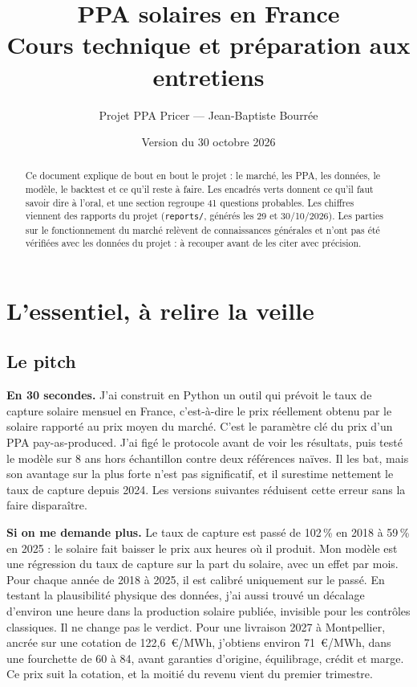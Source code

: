 \documentclass[11pt,a4paper]{article}
\title{\textbf{PPA solaires en France}\\[4pt]\large Cours technique et préparation aux entretiens}
\author{Projet PPA Pricer --- Jean-Baptiste Bourrée}
\date{Version du 30 octobre 2026}
\newcommand{\code}[1]{\texttt{\small #1}}
\begin{document}
\maketitle

\begin{abstract}
\noindent Ce document explique de bout en bout le projet : le marché, les PPA, les données, le modèle, le
backtest et ce qu'il reste à faire. Les encadrés verts donnent ce qu'il faut savoir dire à l'oral, et une section regroupe 41 questions probables.
Les chiffres viennent des rapports du projet (\code{reports/}, générés les 29 et 30/10/2026). Les
parties sur le fonctionnement du marché relèvent de connaissances générales et n'ont pas été
vérifiées avec les données du projet : à recouper avant de les citer avec précision.
\end{abstract}

\setcounter{tocdepth}{1}
\tableofcontents
\newpage

\section{L'essentiel, à relire la veille}

\subsection{Le pitch}

\begin{entretien}
\textbf{En 30 secondes.} J'ai construit en Python un outil qui prévoit le taux de capture solaire
mensuel en France, c'est-à-dire le prix réellement obtenu par le solaire rapporté au prix moyen du
marché. C'est le paramètre clé du prix d'un PPA pay-as-produced. J'ai figé le protocole avant de voir
les résultats, puis testé le modèle sur 8 ans hors échantillon contre deux références naïves. Il les
bat, mais son avantage sur la plus forte n'est pas significatif, et il surestime nettement le taux de
capture depuis 2024. Les versions suivantes réduisent cette erreur sans la faire disparaître.

\medskip
\textbf{Si on me demande plus.} Le taux de capture est passé de 102\,\% en 2018 à 59\,\% en 2025 : le
solaire fait baisser le prix aux heures où il produit. Mon modèle est une régression du taux de
capture sur la part du solaire, avec un effet par mois. Pour chaque année de 2018 à 2025, il est
calibré uniquement sur le passé. En testant la plausibilité physique des données, j'ai aussi trouvé
un décalage d'environ une heure dans la production solaire publiée, invisible pour les contrôles
classiques. Il ne change pas le verdict. Pour une livraison 2027 à Montpellier, ancrée sur une cotation de 122,6~€/MWh, j'obtiens environ 71~€/MWh, dans une fourchette de 60 à 84, avant garanties d'origine, équilibrage, crédit et marge. Ce prix suit la cotation, et la moitié du revenu vient du premier trimestre.
\end{entretien}
\end{document}
